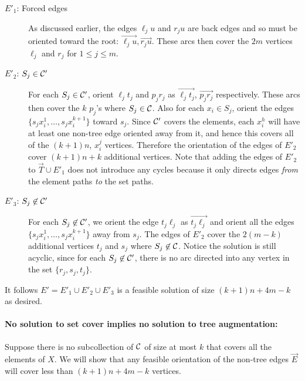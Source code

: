 \documentclass{article}
\newcommand{\ora}{\overrightarrow}
\begin{document}
\begin{description}
\item[$E'_1$: Forced edges] 
	As discussed earlier, the edges $\ell_ju$ and $r_ju$ are back edges and so must be oriented toward the root: $\overrightarrow{\ell_ju}, \overrightarrow{r_ju}$.  	These arcs then cover the $2m$ vertices $\ell_j$ and $r_j$ for
	$1\le j \le m$.

\item[$E'_2$: $S_j\in {\cal C}'$] 
	For each $S_j\in {\cal C}'$, orient $\ell_jt_j$ and $p_jr_j$ as $\ora{\ell_jt_j}$, $\ora{p_jr_j}$ respectively. These arcs then cover the $k$ $p_j$'s where $S_j\in {\cal C}$.
	Also for each $x_i \in S_j$, orient the edges $\{s_jx_i^1,\ldots, s_jx_i^{k+1}\}$ toward $s_j$.  
	Since ${\cal C}'$ covers the elements, each $x_i^h$ will have at least one non-tree edge oriented away from it, and hence this covers all of the $(k+1)n$, $x_i^j$ vertices.
	Therefore the orientation of the edges of $E'_2$ cover $(k+1)n + k$ additional vertices. 	
	Note that adding the edges of $E'_2$ to $\overrightarrow{T} \cup E'_1$ does not introduce any cycles because it only directs edges {\em from} the element paths {\em to} the set paths.
	
\item[$E'_3$: $S_j \not \in {\cal C}'$] 
	For each $S_j \not \in {\cal C}'$, we orient the edge $t_j\ell_j$ as $\ora{t_j\ell_j}$ and orient all the edges $\{s_jx_i^1,\ldots, s_jx_i^{k+1}\}$ away from $s_j$.  
	The edges of $E'_2$ cover the $2(m-k)$ additional vertices $t_j$ and $s_j$ where $S_j\not \in {\cal C}$. 
	Notice the solution is still acyclic, since for each $S_j \not \in {\cal C}'$, there is no arc directed into any vertex in the set $\{r_j,s_j,t_j\}$.
	
\end{description}
It follows $E' = E'_1 \cup E'_2 \cup E'_3$ is a feasible solution of size $(k+1)n + 4m - k$ as desired.  

\paragraph{No solution to {\sc set cover} implies no solution to
  {\sc tree augmentation}:}
Suppose there is no subcollection of $\cal C$ of size at most $k$ that
covers all the elements of $X$.  We will show that any feasible orientation of
the non-tree edges
$\overrightarrow E$ will cover less than $(k+1)n+4m-k$ vertices.
\end{document}
